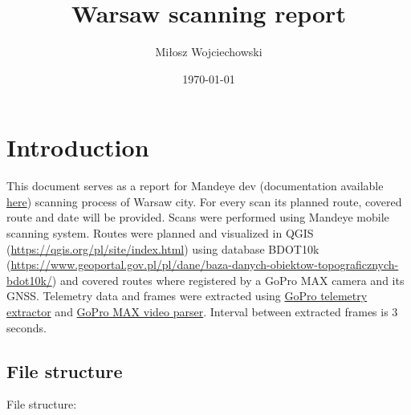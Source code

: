 \documentclass[a4paper,12pt]{book}
\title{Warsaw scanning report}
\author{Miłosz Wojciechowski}
\date{\today}
\begin{document}
\maketitle
\pagebreak
\tableofcontents
\pagebreak

\chapter{Introduction}
This document serves as a report for Mandeye dev (documentation available \href{link}{here}) scanning process of Warsaw city. For every scan its planned route, covered route and date will be provided. Scans were performed using Mandeye mobile scanning system. Routes were planned and visualized in QGIS (\url{https://qgis.org/pl/site/index.html}) using database BDOT10k (\url{https://www.geoportal.gov.pl/pl/dane/baza-danych-obiektow-topograficznych-bdot10k/}) and covered routes where registered by a GoPro MAX camera and its GNSS. Telemetry data and frames were extracted using
\href{https://github.com/miloszwojciechowski/Warsaw-model/tree/main/GoPro-Telemetry-Extractor}{GoPro telemetry extractor} and \href{https://github.com/miloszwojciechowski/Warsaw-model/tree/main/GoPro_MAX_video_parser}{GoPro MAX video parser}. Interval between extracted frames is 3 seconds.\\

\section{File structure}
File structure: 
\end{document}
